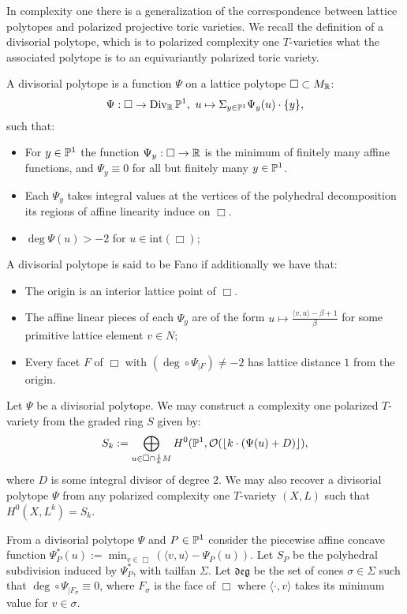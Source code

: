 In complexity one there is a generalization of the correspondence between lattice polytopes and polarized projective toric varieties. We recall the definition of a divisorial polytope, which is to polarized complexity one \(T\)-varieties what the associated polytope is to an equivariantly polarized toric variety. 
\begin{definition} \label{def:divpol}
A divisorial polytope is a function \(\Psi\) on a lattice polytope \(\Box \subset M_{\mathbb{R}}\):
\[
\Psi: \Box \to \operatorname{Div}_{\mathbb{R}} \mathbb{P}^1, \ u \mapsto \Sigma_{y \in \mathbb{P}^1} \Psi_y(u) \cdot \{y\},
\]
such that:
\begin{itemize}
\item For \(y \in \mathbb{P}^1\) the function \(\Psi_y: \Box \to \mathbb{R}\) is the minimum of finitely many  affine functions, and \(\Psi_y \equiv 0\) for all but finitely many \(y \in \mathbb{P}^1\).
\item Each \(\Psi_y\) takes integral values at the vertices of the polyhedral decomposition its regions of affine linearity induce on \(\Box\).
\item \(\deg \Psi(u) > -2\) for \(u \in \text{int} (\Box)\);
\end{itemize}
A divisorial polytope is said to be Fano if additionally we have that:
\begin{itemize}
\item The origin is an interior lattice point of \(\Box\).
\item The affine linear pieces of each  \(\Psi_y\) are of the form \(u \mapsto \frac{\langle v,u \rangle - \beta + 1}{\beta}\) for some primitive lattice element \(v \in N\);
\item Every facet \(F\) of \(\Box\) with \((\deg \circ \Psi _{|F}) \neq -2\) has lattice distance \(1\) from the origin.
\end{itemize}
\end{definition}
Let \(\Psi\) be a divisorial polytope. We may construct a complexity one polarized \(T\)-variety from the graded ring \(S\) given by: 
\[
S_k := \bigoplus_{u \in \Box \cap \frac{1}{k} M} H^0(\mathbb{P}^1, \mathcal{O}(\lfloor k \cdot ( \Psi(u) +D) \rfloor),
\]
where \(D\) is some integral divisor of degree \(2\). We may also recover a divisorial polytope \(\Psi\) from any polarized complexity one \(T\)-variety \((X,L)\) such that \( H^0(X,L^k) = S_k\).

From a divisorial polytope \(\Psi\) and \(P \in \mathbb{P}^1\) consider the piecewise affine concave function \(\Psi^*_P(u) := \min_{v \in \Box}( \langle v,u\rangle - \Psi_P(u) ) \). Let \(S_P \) be the polyhedral subdivision induced by \(\Psi_P^*\), with tailfan \(\Sigma\). Let \(\mathfrak{deg}\) be the set of cones \(\sigma \in \Sigma\) such that \(\deg \circ \Psi _{|F_\sigma}  \equiv 0\), where \(F_\sigma\) is the face of \(\Box\) where \(\langle \cdot, v \rangle\) takes its minimum value for \(v \in \sigma\).

